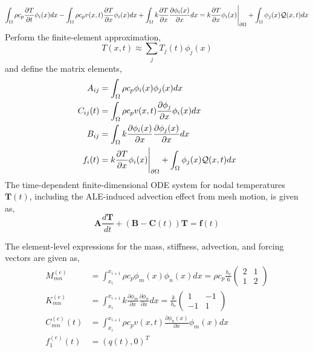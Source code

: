 \begin{equation}
    \int_{\Omega}\rho c_p\frac{\partial T}{\partial t}\phi_i(x)dx - \int_{\Omega}\rho c_p v(x,t)\frac{\partial T}{\partial x}\phi_i(x)dx + \int_{\Omega} k\frac{\partial T}{\partial x}\frac{\partial\phi_i(x)}{\partial x} dx = k\frac{\partial T}{\partial x}\phi_i(x)\Bigg|_{\partial\Omega} + \int_{\Omega}\phi_j(x)\mathcal{Q}(x,t)dx
\end{equation}
Perform the finite-element approximation,
\begin{equation}
    T(x,t)\approx\sum_jT_j(t)\phi_j(x)
\end{equation}
and define the matrix elements,
\begin{align}
    A_{ij} &= \int_{\Omega}\rho c_p\phi_i(x)\phi_j(x)dx\\
    C_{ij}(t) &= \int_{\Omega}\rho c_p v(x,t) \frac{\partial\phi_j}{\partial x}\phi_i(x)dx\\
    B_{ij} &= \int_{\Omega}k\frac{\partial\phi_i(x)}{\partial x}\frac{\partial\phi_j(x)}{\partial x}dx\\
    f_i(t) &= k\frac{\partial T}{\partial x}\phi_i(x)\Bigg|_{\partial\Omega} + \int_{\Omega}\phi_j(x)\mathcal{Q}(x,t)dx
\end{align}
The time-dependent finite-dimensional ODE system for nodal temperatures $\mathbf{T}(t)$, including the ALE-induced advection effect from mesh motion, is given as,
\begin{equation}
    \mathbf{A}\frac{d\mathbf{T}}{dt} + \left(\mathbf{B} - \mathbf{C}(t)\right)\mathbf{T} = \mathbf{f}(t)
\end{equation}

The element-level expressions for the mass, stiffness, advection, and forcing vectors are given as,
\begin{align}
    M^{(e)}_{mn} &= \int_{x_i}^{x_{i+1}}\rho c_p\phi_m(x)\phi_n(x)dx = \rho c_p \frac{h_e}{6}\begin{pmatrix}
        2 & 1 \\ 1 & 2
    \end{pmatrix}\\
    K^{(e)}_{mn} &= \int_{x_i}^{x_{i+1}} k \frac{\partial \phi_m}{\partial x}\frac{\partial \phi_n}{\partial x} dx = \frac{k}{h_e}\begin{pmatrix}
        1 & -1 \\ -1 & 1
    \end{pmatrix}\\
    C^{(e)}_{mn}(t) &= \int_{x_i}^{x_{i+1}}\rho c_p v(x,t) \frac{\partial \phi_n(x)}{\partial x}\phi_m(x) dx\\
    f^{(e)}_1(t) &= \left(q(t),0\right)^T
\end{align}

